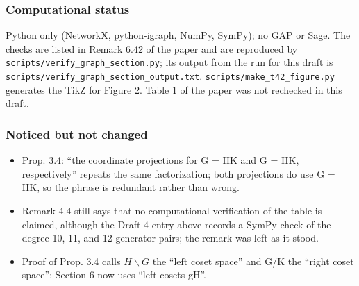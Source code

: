 \documentclass[12pt,letterpaper]{article}
\providecommand{\tightlist}{\setlength{\itemsep}{0pt}\setlength{\parskip}{0pt}}
\begin{document}
\hypertarget{computational-status}{%
\subsubsection*{Computational status}\label{computational-status}}

Python only (NetworkX, python-igraph, NumPy, SymPy); no GAP or Sage. The
checks are listed in Remark 6.42 of the paper and are reproduced by
\texttt{scripts/verify\_graph\_section.py}; its output from the run for
this draft is \texttt{scripts/verify\_graph\_section\_output.txt}.
\texttt{scripts/make\_t42\_figure.py} generates the TikZ for Figure 2.
Table 1 of the paper was not rechecked in this draft.

\hypertarget{noticed-but-not-changed}{%
\subsubsection*{Noticed but not changed}\label{noticed-but-not-changed}}

\begin{itemize}
\tightlist
\item
  Prop. 3.4: ``the coordinate projections for G = HK and G = HK,
  respectively'' repeats the same factorization; both projections do use
  G = HK, so the phrase is redundant rather than wrong.
\item
  Remark 4.4 still says that no computational verification of the table
  is claimed, although the Draft 4 entry above records a SymPy check of
  the degree 10, 11, and 12 generator pairs; the remark was left as it
  stood.
\item
  Proof of Prop. 3.4 calls $H\backslash G$ the ``left coset space'' and G/K the
  ``right coset space''; Section 6 now uses ``left cosets gH''.
\end{itemize}
\end{document}
